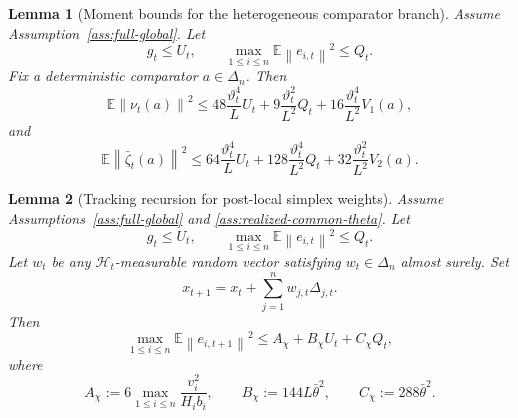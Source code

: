 \documentclass[10pt,a4paper]{amsart}
\newtheorem{lemma}{Lemma}
\newcommand{\EE}{\mathbb E}
\newcommand{\norm}[1]{\left\lVert #1\right\rVert}
\begin{document}
\begin{lemma}[Moment bounds for the heterogeneous comparator branch]
\label{lem:realized-het-moments}
Assume Assumption~\ref{ass:full-global}. Let
\[
g_t\le U_t,
\qquad
\max_{1\le i\le n}\EE\norm{e_{i,t}}^2\le Q_t.
\]
Fix a deterministic comparator $a\in\Delta_n$. Then
\begin{equation}
\EE\norm{\nu_t(a)}^2
\le
48\frac{\vartheta_t^4}{L}U_t
+
9\frac{\vartheta_t^2}{L^2}Q_t
+
16\frac{\vartheta_t^4}{L^2}V_1(a),
\label{eq:realized-het-moment-nu}\end{equation}
and
\begin{equation}
\EE\norm{\bar\zeta_t(a)}^2
\le
64\frac{\vartheta_t^4}{L}U_t
+
128\frac{\vartheta_t^4}{L^2}Q_t
+
32\frac{\vartheta_t^2}{L^2}V_2(a).
\label{eq:realized-het-moment-zeta}\end{equation}
\end{lemma}

\begin{lemma}[Tracking recursion for post-local simplex weights]
\label{lem:realized-het-tracking}
Assume Assumptions~\ref{ass:full-global} and \ref{ass:realized-common-theta}. Let
\[
g_t\le U_t,
\qquad
\max_{1\le i\le n}\EE\norm{e_{i,t}}^2\le Q_t.
\]
Let $w_t$ be any $\mathcal H_t$-measurable random vector satisfying $w_t\in\Delta_n$ almost surely.
Set
\begin{equation}
x_{t+1}=x_t+\sum_{j=1}^n w_{j,t}\Delta_{j,t}.
\label{eq:realized-het-tracking-update}\end{equation}
Then
\begin{equation}
\max_{1\le i\le n}\EE\norm{e_{i,t+1}}^2
\le
A_\chi+B_\chi U_t+C_\chi Q_t,
\label{eq:realized-het-tracking}\end{equation}
where
\[
A_\chi:=6\max_{1\le i\le n}\frac{v_i^2}{H_i b_i},
\qquad
B_\chi:=144L\bar\theta^2,
\qquad
C_\chi:=288\bar\theta^2.
\]
\end{lemma}
\end{document}
